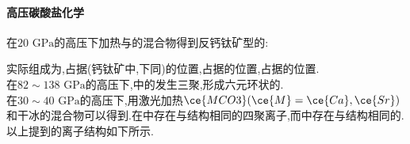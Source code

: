 \documentclass[draft]{ctexart}
\begin{document}
\paragraph{高压碳酸盐化学}
在$20\text{ GPa}$的高压下加热与的混合物得到反钙钛矿型的:
\begin{center}
\end{center}
实际组成为,占据(钙钛矿中,下同)的位置,占据的位置,占据的位置.\\
\indent 在$82\sim138\text{ GPa}$的高压下,中的发生三聚,形成六元环状的.\\
\indent 在$30\sim40\text{ GPa}$的高压下,用激光加热$\ce{MCO3}(\ce{M}=\ce{Ca},\ce{Sr})$和干冰的混合物可以得到.在中存在与结构相同的四聚离子,而中存在与结构相同的.\\
\indent 以上提到的离子结构如下所示.
\end{document}
